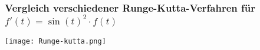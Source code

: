 %
\begin{frame}\frametitle{Vergleich verschiedener Runge-Kutta-Verfahren für $f'(t)=\sin(t)^2\cdot f(t)$}
\texttt{[image: Runge-kutta.png]}
\end{frame}
%




